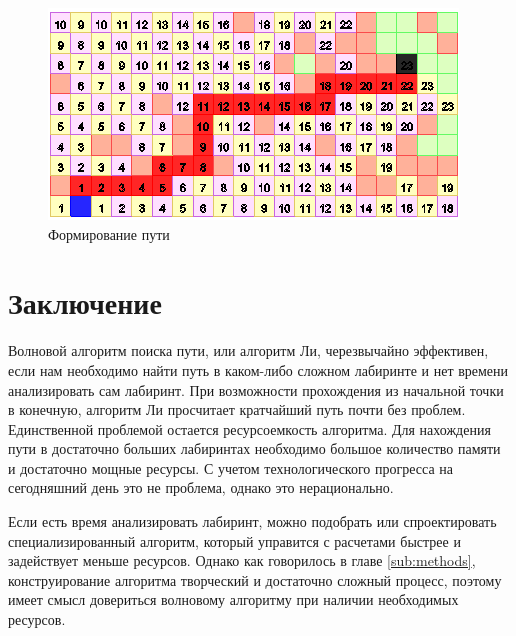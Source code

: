 \begin{figure}[ht]
    \includegraphics[width=.7\linewidth]{Figures/trace.png}
    \caption{Формирование пути}
    \label{fig:trace}
\end{figure}

\section*{Заключение}

Волновой алгоритм поиска пути, или алгоритм Ли, черезвычайно эффективен, если нам необходимо найти путь в каком-либо сложном лабиринте и нет времени анализировать сам лабиринт. При возможности прохождения из начальной точки в конечную, алгоритм Ли просчитает кратчайший путь почти без проблем. Единственной проблемой остается ресурсоемкость алгоритма. Для нахождения пути в достаточно больших лабиринтах необходимо большое количество памяти и достаточно мощные ресурсы. С учетом технологического прогресса на сегодняшний день это не проблема, однако это нерационально.

Если есть время анализировать лабиринт, можно подобрать или спроектировать специализированный алгоритм, который управится с расчетами быстрее и задействует меньше ресурсов. Однако как говорилось в главе \ref{sub:methods}, конструирование алгоритма творческий и достаточно сложный процесс, поэтому имеет смысл довериться волновому алгоритму при наличии необходимых ресурсов.

\clearpage

